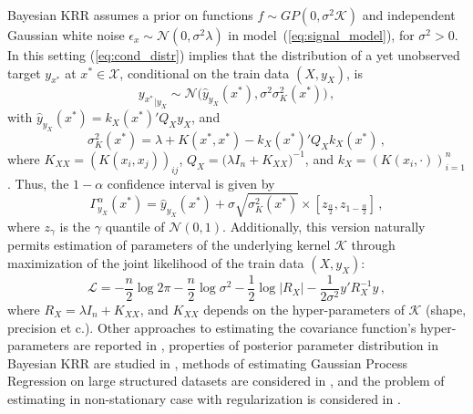 \documentclass[10pt, conference, compsocconf]{IEEEtran}
\newcommand{\Ncal}{\mathcal{N}}
\newcommand{\Kcal}{\mathcal{K}}
\newcommand{\Xcal}{\mathcal{X}}
\begin{document}
Bayesian KRR assumes a prior on functions $f\sim GP(0, \sigma^2 \Kcal)$ and independent
Gaussian white noise $\epsilon_x\sim \Ncal(0, \sigma^2 \lambda)$ in model~(\ref{eq:signal_model}),
for $\sigma^2 > 0$. In this setting (\ref{eq:cond_distr}) implies that the distribution
of a yet unobserved target $y_{x^*}$ at $x^*\in \Xcal$, conditional on the train data $(X, y_X)$,
is
\begin{equation} \label{eq:gp_cond_dist}
{y_{x^*}}_{|y_X}
  \sim \Ncal\bigl(\hat{y}_{y_X}(x^*), \sigma^2 \sigma_K^2(x^*)\bigr) \,,
\end{equation}
with $\hat{y}_{y_X}(x^*) = k_X(x^*)' Q_X y_X$, and
\begin{equation*}
  \sigma_K^2(x^*)
    = \lambda + K(x^*, x^*) - k_X(x^*)' Q_X k_X(x^*) \,,
\end{equation*}
where $K_{XX} = (K(x_i,x_j))_{ij}$, $Q_X = \bigl(\lambda I_n + K_{XX}\bigr)^{-1}$,
and $k_X = (K(x_i, \cdot))_{i=1}^n$. Thus, the $1 - \alpha$ confidence interval is
given by
\begin{equation} \label{eq:gp_conf_int}
\Gamma^\alpha_{y_X}(x^*)
  = \hat{y}_{y_X}(x^*)
  + \sigma \sqrt{\sigma_K^2(x^*)}
  \times [z_{\frac{\alpha}{2}}, z_{1-\frac{\alpha}{2}}]
  \,,
\end{equation}
where $z_\gamma$ is the $\gamma$ quantile of $\Ncal(0, 1)$. Additionally, this version
naturally permits estimation of parameters of the underlying kernel $\Kcal$ through
maximization of the joint likelihood of the train data $(X, y_X)$:
\begin{equation} \label{eq:bkrr_likelihood}
  \mathcal{L}
    = -\frac{n}{2} \log 2\pi
    - \frac{n}{2}\log \sigma^2
    - \frac{1}{2}\log \lvert R_X \rvert
    - \frac{1}{2\sigma^2} y' R_X^{-1} y
    \,,
\end{equation}
where $R_X = \lambda I_n + K_{XX}$, and $K_{XX}$ depends on the hyper-parameters of
$\Kcal$ (shape, precision et c.).
Other approaches to estimating the covariance function's hyper-parameters are reported
in \cite{Burnaev2014}, properties of posterior parameter distribution in Bayesian KRR
are studied in \cite{Zaitsev2013}, methods of estimating Gaussian Process Regression
on large structured datasets are considered in \cite{Belyaev2015, Belyaev2016}, and
the problem of estimating in non-stationary case with regularization is considered in 
\cite{Burnaev2016}.

\end{document}
